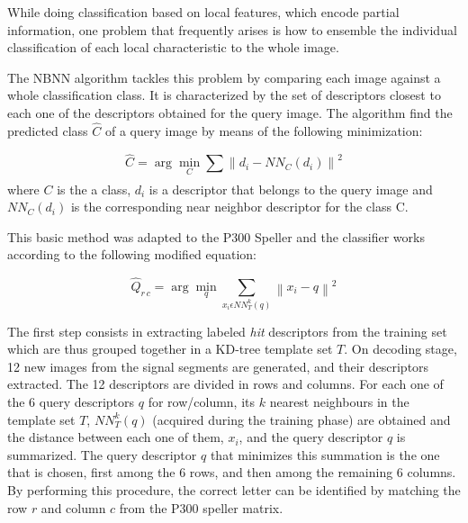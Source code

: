 \documentclass[entropy,article,submit,moreauthors,pdftex,10pt,a4paper]{mdpi}
\begin{document}

While doing classification based on local features, which encode partial information, one problem that frequently arises is how to ensemble the individual classification of each local characteristic to the whole image. %

The NBNN algorithm tackles this problem by comparing each image against a whole classification class. It is characterized by the set of descriptors closest to each one of the descriptors obtained for the query image.  The algorithm  find the predicted class $\hat{C}$ of a query image by means of the following minimization:

\begin{equation}
\hat{C} = \arg \min_C \sum_{}^{} \left\lVert d_i - NN_C(d_i) \right\rVert ^2
\label{eq:classification}
\end{equation}
where $C$ is the a class, $ d_i $ is a descriptor that belongs to the query image and $ NN_C(d_i) $ is the corresponding near neighbor descriptor for the class C.

This basic method was adapted to the P300 Speller and the classifier works according to the following modified equation:

\begin{equation}
\hat{Q}_{r\,c} = \arg \min_q \sum_{x_i \epsilon NN_T^k(q)}^{} \left\lVert x_i - q \right\rVert ^2
\label{eq:multiclassification}
\end{equation}

The first step consists in extracting labeled \textit{hit} descriptors from the training set which are thus grouped together in a KD-tree \citep{Vedaldi2010} template set $ T $.  On decoding stage, 12 new images from the signal segments are generated, and their descriptors extracted.  The 12 descriptors are divided in rows and columns.  For each one of the 6 query descriptors $ q $ for row/column, its $ k $ nearest neighbours in the template set $T$, $ NN_T^k(q) $ (acquired during the training phase)  are obtained and the distance between each one of them, $ x_i $, and the query descriptor $ q $ is summarized.  The query descriptor $ q $ that minimizes this summation is the one that is chosen, first among the 6 rows, and then among the remaining 6 columns.  By performing this procedure, the correct letter can be identified by matching the row $ r $ and column $ c $ from the P300 speller matrix.   
\end{document}
